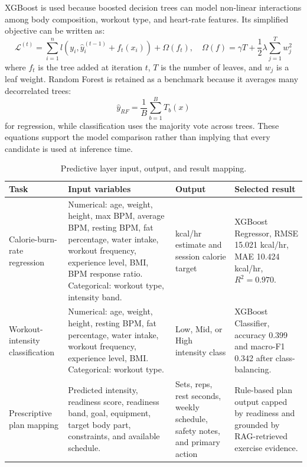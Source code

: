 \documentclass{aitthesis}
\begin{document}
XGBoost is used because boosted decision trees can model non-linear interactions among body composition, workout type, and heart-rate features. Its simplified objective can be written as:
\begin{equation}
\mathcal{L}^{(t)}=\sum_{i=1}^{n}l\left(y_i,\hat{y}_i^{(t-1)}+f_t(x_i)\right)+\Omega(f_t), \quad
\Omega(f)=\gamma T+\frac{1}{2}\lambda\sum_{j=1}^{T}w_j^2
\end{equation}
where $f_t$ is the tree added at iteration $t$, $T$ is the number of leaves, and $w_j$ is a leaf weight. Random Forest is retained as a benchmark because it averages many decorrelated trees:
\begin{equation}
\hat{y}_{RF}=\frac{1}{B}\sum_{b=1}^{B}T_b(x)
\end{equation}
for regression, while classification uses the majority vote across trees. These equations support the model comparison rather than implying that every candidate is used at inference time.

\begin{table}[htbp]
\centering
\small
\caption{Predictive layer input, output, and result mapping.}
\label{tab:ml_input_output}
\begin{tabularx}{\linewidth}{p{3.2cm}p{4.4cm}p{3.2cm}X}
\toprule
\textbf{Task} & \textbf{Input variables} & \textbf{Output} & \textbf{Selected result} \\
\midrule
Calorie-burn-rate regression & Numerical: age, weight, height, max BPM, average BPM, resting BPM, fat percentage, water intake, workout frequency, experience level, BMI, BPM response ratio. Categorical: workout type, intensity band. & kcal/hr estimate and session calorie target & XGBoost Regressor, RMSE 15.021 kcal/hr, MAE 10.424 kcal/hr, $R^2=0.970$. \\[10pt]
Workout-intensity classification & Numerical: age, weight, height, resting BPM, fat percentage, water intake, workout frequency, experience level, BMI. Categorical: workout type. & Low, Mid, or High intensity class & XGBoost Classifier, accuracy 0.399 and macro-F1 0.342 after class-balancing. \\[10pt]
Prescriptive plan mapping & Predicted intensity, readiness score, readiness band, goal, equipment, target body part, constraints, and available schedule. & Sets, reps, rest seconds, weekly schedule, safety notes, and primary action & Rule-based plan output capped by readiness and grounded by RAG-retrieved exercise evidence. \\
\bottomrule
\end{tabularx}
\end{table}
\end{document}
